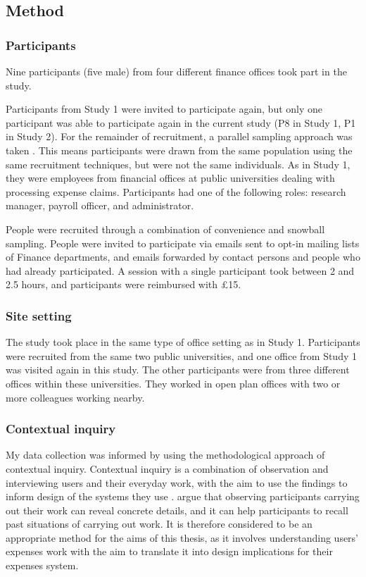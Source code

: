 \subsection{Method}
\subsubsection{Participants}
Nine participants (five male) from four different finance offices took part in the study. 

Participants from Study 1 were invited to participate again, but only one participant was able to participate again in the current study (P8 in Study 1, P1 in Study 2). 
For the remainder of recruitment, a parallel sampling approach was taken \citep{Onwuegbuzie2008}. This means participants were drawn from the same population using the same recruitment techniques, but were not the same individuals. As in Study 1, they were employees from financial offices at public universities dealing with processing expense claims. Participants had one of the following roles: research manager, payroll officer, and administrator.

People were recruited through a combination of convenience and snowball sampling. People were invited to participate via emails sent to opt-in mailing lists of Finance departments, and emails forwarded by contact persons and people who had already participated. A session with a single participant took between 2 and 2.5 hours, and participants were reimbursed with \pounds15.

\subsubsection{Site setting}
The study took place in the same type of office setting as in Study 1. Participants were recruited from the same two public universities, and one office from Study 1 was visited again in this study. The other participants were from three different offices within these universities. They worked in open plan offices with two or more colleagues working nearby. 

\subsubsection{Contextual inquiry}
My data collection was informed by using the methodological approach of contextual inquiry.
Contextual inquiry is a combination of observation and interviewing users and their everyday work, with the aim to use the findings to inform design of the systems they use \citep{Holtzblatt2014}.
\citet{Holtzblatt2014} argue that observing participants carrying out their work can reveal concrete details, and it can help participants to recall past situations of carrying out work. It is therefore considered to be an appropriate method for the aims of this thesis, as it involves understanding users' expenses work with the aim to translate it into design implications for their expenses system. 

